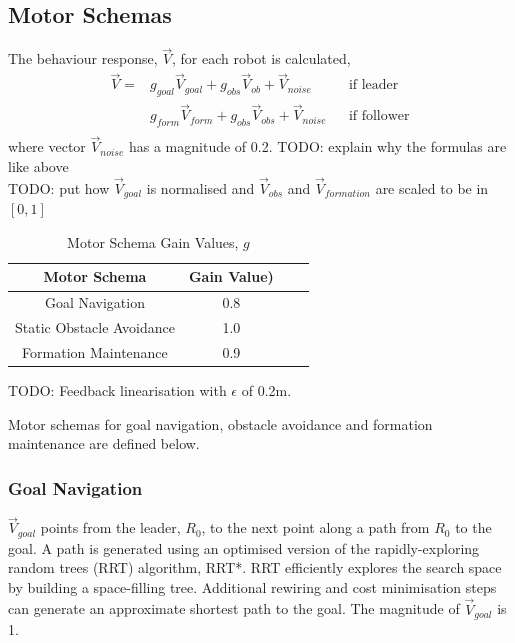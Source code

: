 \documentclass[letterpaper, 10 pt, conference]{ieeeconf}  %
\begin{document}
\subsection{Motor Schemas}
The behaviour response, $\vec{V}$, for each robot is calculated,
\begin{equation*}
\begin{aligned}
\vec{V} =   & g_{goal} \vec{V}_{goal} + g_{obs} \vec{V}_{ob} + \vec{V}_{noise}        && \text{if leader}\\
      & g_{form} \vec{V}_{form} + g_{obs} \vec{V}_{obs} + \vec{V}_{noise}       && \text{if follower}\\
\end{aligned}
\end{equation*}
where vector $\vec{V}_{noise}$ has a magnitude of 0.2. 
TODO: explain why the formulas are like above \\
TODO: put how $\vec{V}_{goal}$ is normalised and $\vec{V}_{obs}$ and $\vec{V}_{formation}$ are scaled to be in $[0,1]$

\begin{table}[h]
\label{table_example}
\begin{center}
\begin{tabular}{|c||c||c c|}
\hline
Motor Schema & Gain Value)\\
\hline
Goal Navigation             & 0.8 \\
Static Obstacle Avoidance   & 1.0 \\
Formation Maintenance       & 0.9 \\
\hline
\end{tabular}
\end{center}
\caption{Motor Schema Gain Values, $g$}
\end{table}

TODO: Feedback linearisation with $\epsilon$ of 0.2m.

Motor schemas for goal navigation, obstacle avoidance and formation maintenance are defined below.

\subsubsection*{Goal Navigation}
$\vec{V}_{goal}$ points from the leader, $R_0$, to the next point along a path from $R_0$ to the goal. A path is generated using an optimised version of the rapidly-exploring random trees (RRT) algorithm, RRT*. RRT efficiently explores the search space by building a space-filling tree. Additional rewiring and cost minimisation steps can generate an approximate shortest path to the goal. The magnitude of $\vec{V}_{goal}$ is 1.
\end{document}
